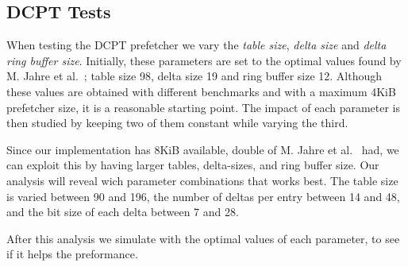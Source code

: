 \subsection{DCPT Tests}

When testing the DCPT prefetcher we vary the \emph{table size}, \emph{delta
size} and \emph{delta ring buffer size}. Initially, these parameters are set 
to the optimal values found by M. Jahre et
al.~\cite{dcpt}; table size 98, delta size 19 and ring buffer size 12. Although
these values are obtained with different benchmarks and with a maximum 4KiB
prefetcher size, it is a reasonable starting point. The impact of each parameter
is then studied by keeping two of them constant while varying the third.

Since our implementation has 8KiB available, double of M. Jahre et
al.~\cite{dcpt} had, we can exploit this by having larger tables, delta-sizes,
and ring buffer size. Our analysis will reveal wich parameter combinations that
works best. The table size is varied between 90 and 196, the number of deltas per 
entry between 14 and 48, and the bit size of each delta between 7 and 28.

After this analysis we simulate with the optimal values of each parameter, to
see if it helps the preformance.
